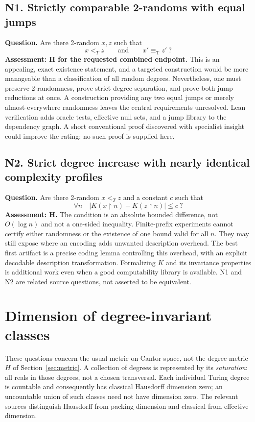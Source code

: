 \documentclass[11pt,a4paper]{article}
\newcommand{\eqT}{\equiv_{\mathrm T}}
\newcommand{\problem}[2]{\subsection{#1. #2}\label{entry:#1}}
\theoremstyle{definition}\newtheorem{definition}[theorem]{Definition}
\theoremstyle{remark}\newtheorem{remark}[theorem]{Remark}
\begin{document}
\problem{N1}{Strictly comparable 2-randoms with equal jumps}
\textbf{Question.} Are there 2-random $x,z$ such that
\[
 x<_T z\qquad\text{and}\qquad x'\eqT z'\ ?
\]
\textbf{Assessment: H for the requested combined endpoint.} This is an
appealing, exact existence statement, and a targeted construction would be
more manageable than a classification of all random degrees. Nevertheless,
one must preserve 2-randomness, prove strict degree separation, and prove
both jump reductions at once. A construction providing any two equal jumps
or merely almost-everywhere randomness leaves the central requirements
unresolved. Lean verification adds oracle tests, effective null sets, and a
jump library to the dependency graph. A short conventional proof discovered
with specialist insight could improve the rating; no such proof is supplied
here.

\problem{N2}{Strict degree increase with nearly identical complexity profiles}
\textbf{Question.} Are there 2-random $x<_T z$ and a constant $c$ such that
\[
 \forall n\quad
 \bigl|K(x\mathbin{\upharpoonright}n)-
       K(z\mathbin{\upharpoonright}n)\bigr|\leq c\ ?
\]
\textbf{Assessment: H.} The condition is an absolute bounded difference, not
$O(\log n)$ and not a one-sided inequality. Finite-prefix experiments cannot
certify either randomness or the existence of one bound valid for all $n$.
They may still expose where an encoding adds unwanted description overhead.
The best first artifact is a precise coding lemma controlling this overhead,
with an explicit decodable description transformation. Formalizing $K$ and
its invariance properties is additional work even when a good computability
library is available. N1 and N2 are related source questions, not asserted
to be equivalent.



\section{Dimension of degree-invariant classes}
\label{sec:dimension}
These questions concern the usual metric on Cantor space, not the degree metric $H$ of Section~\ref{sec:metric}. A collection of degrees is represented by its \emph{saturation}: all reals in those degrees, not a chosen transversal. Each individual Turing degree is countable and consequently has classical Hausdorff dimension zero; an uncountable union of such classes need not have dimension zero. The relevant sources distinguish Hausdorff from packing dimension and classical from effective dimension.\cite{SY}
\end{document}
